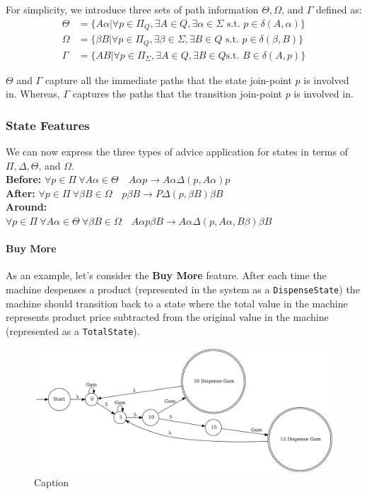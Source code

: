 \documentclass[sigplan,anonymous,review]{acmart}
\begin{document}
For simplicity, we introduce three sets of path information $\Theta, \Omega$, and $\Gamma$ defined as:
\begin{align*}
    \Theta &= \{A \alpha | \forall p \in \Pi_Q, \exists A \in Q, \exists \alpha \in \Sigma \text{ s.t. } p \in \delta(A, \alpha)\}\\
    \Omega &= \{\beta B | \forall p \in \Pi_Q, \exists \beta \in \Sigma, \exists B \in Q \text{ s.t. } p \in \delta(\beta, B)\}\\
    \Gamma &= \{AB | \forall p \in \Pi_\Sigma, \exists A \in Q, \exists B \in Q \text {s.t. } B \in \delta(A, p)\}
\end{align*}

$\Theta$ and $\Gamma$ capture all the immediate paths that the state join-point $p$ is involved in. Whereas, $\Gamma$ captures the paths that the transition join-point $p$ is involved in. 

\subsubsection{State Features}
We can now express the three types of advice application for states in terms of $\Pi, \Delta, \Theta$, and $\Omega$.\\
\textbf{Before:} $\forall p \in \Pi \ \forall A \alpha \in \Theta \quad A \alpha p \rightarrow A \alpha \Delta(p, A \alpha)p$\\
\textbf{After:} $\forall p \in \Pi \ \forall \beta B \in \Omega \quad p\beta B \rightarrow P\Delta(p, \beta B)\beta B$\\
\textbf{Around:} \\
$\forall p \in \Pi \ \forall A \alpha \in \Theta \ \forall \beta B \in \Omega \quad A \alpha p \beta B \rightarrow A \alpha \Delta(p, A \alpha, B \beta) \beta B $

\paragraph{Buy More} As an example, let's consider the \textbf{Buy More} feature. After each time the machine despenses a product (represented in the system as a \texttt{DispenseState}) the machine should transition back to a state where the total value in the machine represents product price subtracted from the original value in the machine (represented as a \texttt{TotalState}).

\begin{figure}
    \centering
    \includegraphics[width=\textwidth]{figures/vend2.pdf}
    \caption{Caption}
    \label{fig:my_label}
\end{figure}
\end{document}
